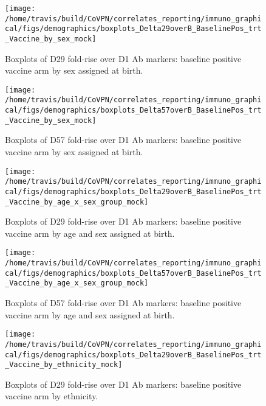 \documentclass[]{book}
\theoremstyle{definition}
\theoremstyle{definition}
\theoremstyle{definition}
\newcommand{\1}{\mathbbm{1}}
\begin{document}
\begin{figure}[H]

{\centering \texttt{[image: /home/travis/build/CoVPN/correlates\_reporting/immuno\_graphical/figs/demographics/boxplots\_Delta29overB\_BaselinePos\_trt\_Vaccine\_by\_sex\_mock]} 

}

\caption{Boxplots of D29 fold-rise over D1 Ab markers: baseline positive vaccine arm by sex assigned at birth.}\label{fig:unnamed-chunk-178}
\end{figure}

\begin{figure}[H]

{\centering \texttt{[image: /home/travis/build/CoVPN/correlates\_reporting/immuno\_graphical/figs/demographics/boxplots\_Delta57overB\_BaselinePos\_trt\_Vaccine\_by\_sex\_mock]} 

}

\caption{Boxplots of D57 fold-rise over D1 Ab markers: baseline positive vaccine arm by sex assigned at birth.}\label{fig:unnamed-chunk-179}
\end{figure}

\begin{figure}[H]

{\centering \texttt{[image: /home/travis/build/CoVPN/correlates\_reporting/immuno\_graphical/figs/demographics/boxplots\_Delta29overB\_BaselinePos\_trt\_Vaccine\_by\_age\_x\_sex\_group\_mock]} 

}

\caption{Boxplots of D29 fold-rise over D1 Ab markers: baseline positive vaccine arm by age and sex assigned at birth.}\label{fig:unnamed-chunk-182}
\end{figure}

\begin{figure}[H]

{\centering \texttt{[image: /home/travis/build/CoVPN/correlates\_reporting/immuno\_graphical/figs/demographics/boxplots\_Delta57overB\_BaselinePos\_trt\_Vaccine\_by\_age\_x\_sex\_group\_mock]} 

}

\caption{Boxplots of D57 fold-rise over D1 Ab markers: baseline positive vaccine arm by age and sex assigned at birth.}\label{fig:unnamed-chunk-183}
\end{figure}

\begin{figure}[H]

{\centering \texttt{[image: /home/travis/build/CoVPN/correlates\_reporting/immuno\_graphical/figs/demographics/boxplots\_Delta29overB\_BaselinePos\_trt\_Vaccine\_by\_ethnicity\_mock]} 

}

\caption{Boxplots of D29 fold-rise over D1 Ab markers: baseline positive vaccine arm by ethnicity.}\label{fig:unnamed-chunk-186}
\end{figure}
\end{document}
